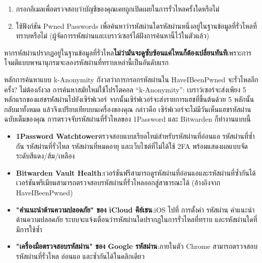 \begin{enumerate}
  \item กรอกอีเมลเพื่อตรวจสอบว่าบัญชีของคุณเคยถูกเปิดเผยในการรั่วไหลครั้งใดหรือไม่
  \item ใช้ฟังก์ชัน Pwned Passwords เพื่อค้นหาว่ารหัสผ่านใดรหัสผ่านหนึ่งอยู่ในฐานข้อมูลที่รั่วไหลที่ทราบหรือไม่ (ผู้จัดการรหัสผ่านและเบราว์เซอร์ได้ฝังการค้นหานี้ไว้ในตัวแล้ว)
\end{enumerate}

หากรหัสผ่านปรากฏอยู่ในฐานข้อมูลที่รั่วไหล\textbf{ไม่ว่ามันจะดูซับซ้อนแค่ไหนก็ต้องเปลี่ยนทันที}เพราะการโจมตีแบบพจนานุกรมจะลองรหัสผ่านที่ทราบเหล่านี้เป็นอันดับแรก

\begin{tcbinfo}{หลักการค้นหาแบบ k-Anonymity}
กังวลว่าการกรอกรหัสผ่านใน HaveIBeenPwned จะรั่วไหลอีกครั้ง? ไม่ต้องกังวล การค้นหาสมัยใหม่ใช้โปรโตคอล “k-Anonymity”: เบราว์เซอร์จะส่งเพียง 5 หลักแรกของแฮชรหัสผ่านไปยังเซิร์ฟเวอร์ จากนั้นเซิร์ฟเวอร์จะส่งรายการแฮชที่ขึ้นต้นด้วย 5 หลักนั้นกลับมาทั้งหมด แล้วจึงเปรียบเทียบบนเครื่องของคุณ กล่าวคือ เซิร์ฟเวอร์จะไม่มีวันเห็นแฮชรหัสผ่านฉบับเต็มของคุณ การตรวจจับรหัสผ่านที่รั่วไหลของ 1Password และ Bitwarden ก็ทำงานแบบนี้

\end{tcbinfo}


\begin{itemize}
  \item \textbf{1Password Watchtower}ตรวจสอบแบบเรียลไทม์สำหรับรหัสผ่านที่อ่อนแอ รหัสผ่านที่ซ้ำกัน รหัสผ่านที่รั่วไหล รหัสผ่านที่หมดอายุ และเว็บไซต์ที่ไม่ได้ใช้ 2FA พร้อมแสดงผลแบบจัดระดับสีแดง/ส้ม/เหลือง
  \item \textbf{Bitwarden Vault Health}:เวอร์ชันฟรีสามารถดูรหัสผ่านที่อ่อนแอและรหัสผ่านที่ซ้ำกันได้ เวอร์ชันพรีเมียมสามารถตรวจสอบรหัสผ่านที่รั่วไหลออกสู่สาธารณะได้ (อ้างอิงจาก HaveIBeenPwned)
  \item \textbf{"คำแนะนำด้านความปลอดภัย" ของ iCloud คีย์เชน}:iOS ไปที่ การตั้งค่า รหัสผ่าน คำแนะนำด้านความปลอดภัย ระบบจะแจ้งเตือนว่ารหัสผ่านใดปรากฏในการรั่วไหลที่ทราบ และรหัสผ่านใดที่มีการใช้ซ้ำ
  \item \textbf{"เครื่องมือตรวจสอบรหัสผ่าน" ของ Google รหัสผ่าน}:ภายในตัว Chrome สามารถตรวจสอบรหัสผ่านที่รั่วไหล อ่อนแอ และซ้ำกันได้ในคลิกเดียว
\end{itemize}

